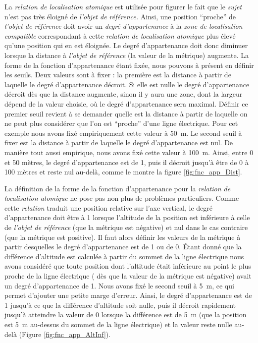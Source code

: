 La \emph{relation de localisation atomique}  est
utilisée pour figurer le fait que le \emph{sujet} n'est pas très
éloigné de \emph{l'objet de référence.} Ainsi, une position
\enquote{proche} de \emph{l'objet de référence} doit avoir un
\emph{degré d'appartenance} à la \emph{zone de localisation
  compatible} correspondant à cette \emph{relation de localisation
  atomique} plus élevé qu'une position qui en est éloignée. Le degré
d'appartenance doit donc diminuer lorsque la distance à \emph{l'objet
  de référence} (\ie la valeur de la métrique) augmente. La forme de
la fonction d'appartenance étant fixée, nous pouvons à présent en
définir les seuils. Deux valeurs sont à fixer : la première est la
distance à partir de laquelle le degré d'appartenance décroit. Si elle
est nulle le degré d’appartenance décroit dès que la distance
augmente, sinon il y aura une zone, dont la largeur dépend de la
valeur choisie, où le degré d'appartenance sera maximal. Définir ce
premier seuil revient à se demander quelle est la distance à partir de
laquelle on ne peut plus considérer que l'on est \enquote{proche}
d'une ligne électrique. Pour cet exemple nous avons fixé empiriquement
cette valeur à \SI{50}{\meter}. Le second seuil à fixer est la
distance à partir de laquelle le degré d'appartenance est nul. De
manière tout aussi empirique, nous avons fixé cette valeur à
\SI{100}{\meter}. Ainsi, entre 0 et 50 mètres, le degré d'appartenance
est de 1, puis il décroit jusqu’à être de 0 à 100 mètres et reste nul
au-delà, comme le montre la figure \ref{fig:fnc_app_Dist}.

La définition de la forme de la fonction d'appartenance pour la
\emph{relation de localisation atomique}
 ne pose
pas non plus de problèmes particuliers. Comme cette \emph{relation}
traduit une position relative sur l'axe vertical, le degré
d'appartenance doit être à 1 lorsque l'altitude de la position est
inférieure à celle de \emph{l'objet de référence} (\ie que la métrique
est négative) et nul dans le cas contraire (\ie que la métrique est
positive). Il faut alors définir les valeurs de la métrique à partir
desquelles le degré d'appartenance est de 1 ou de 0. Étant donné que
la différence d'altitude est calculée à partir du sommet de la ligne
électrique nous avons considéré que toute position dont l'altitude
était inférieure au point le plus proche de la ligne électrique (\ie
dès que la valeur de la métrique est négative) avait un degré
d'appartenance de 1. Nous avons fixé le second seuil à \SI{5}{\meter},
ce qui permet d'ajouter une petite marge d'erreur. Ainsi, le degré
d'appartenance est de 1 jusqu’à ce que la différence d'altitude soit
nulle, puis il décroit rapidement jusqu'à atteindre la valeur de 0
lorsque la différence est de \SI{5}{\meter} (\ie que la position est
\SI{5}{\meter} au-dessus du sommet de la ligne électrique) et la
valeur reste nulle au-delà (Figure \ref{fig:fnc_app_AltInf}).

